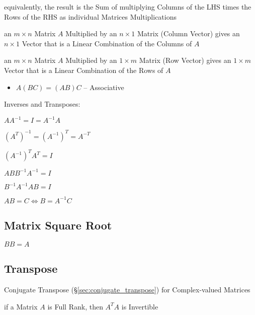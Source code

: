 equivalently, the result is the Sum of multiplying Columns of the LHS times the
Rows of the RHS as individual Matrices Multiplications

an $m \times n$ Matrix $A$ Multiplied by an $n \times 1$ Matrix (Column Vector)
gives an $n \times 1$ Vector that is a Linear Combination of the Columns of $A$

an $m \times n$ Matrix $A$ Multiplied by an $1 \times m$ Matrix (Row Vector)
gives an $1 \times m$ Vector that is a Linear Combination of the Rows of $A$

\begin{itemize}
  \item $A(BC) = (AB)C$ -- Associative
\end{itemize}

Inverses and Transposes:

$AA^{-1} = I = A^{-1}A$

$(A^T)^{-1} = (A^{-1})^T = A^{-T}$

$(A^{-1})^T A^T = I$

$ABB^{-1}A^{-1} = I$

$B^{-1}A^{-1}AB = I$

$AB = C \Leftrightarrow B = A^{-1}C$



\subsection{Matrix Square Root}\label{sec:matrix_square_root}

$BB = A$



\subsection{Transpose}\label{sec:transpose}

Conjugate Transpose (\S\ref{sec:conjugate_transpose}) for Complex-valued
Matrices

if a Matrix $A$ is Full Rank, then $A^TA$ is Invertible

